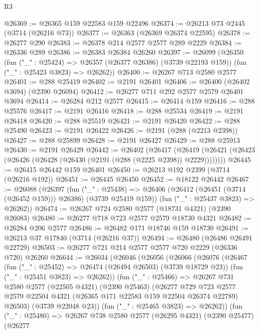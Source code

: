 \begin{lexlean}{R3}
\begin{coremodule}
@26369 := @26365 @159 @22583 @159 @22496
@26374 := @26213 @73 @2445 (@3714 (@26216 @73))
@26377 := @26363 (@26369 @26374 @22595)
@26378 := @26277 @290
@26383 := @26378 @214 @2577 @2577 @289 @2229
@26384 := @26336 @289
@26386 := @26383 @26384 @26260
@26397 := @26099
    (@26350
      (fun ("_" : @25424) => @26357 (@26377 @26386) (@3739 @22193 @159))
      (fun ("_" : @25423 @3823) => @26262))
@26400 := @26267 @713 @2580 @2577
@26401 := @288 @25419
@26402 := @2191 @26401
@26406 := @26400 (@26402 @3694) (@2390 @26094)
@26412 := @26277 @711 @292 @2577 @2579 @26401 @3694
@26414 := @26284 @212 @2577
@26415 := @26414 @159
@26416 := @288 @25576
@26417 := @2191 @26416
@26418 := @288 @25534
@26419 := @2191 @26418
@26420 := @288 @25519
@26421 := @2191 @26420
@26422 := @288 @25490
@26423 := @2191 @26422
@26426 := @2191 (@288 (@2213 @2398))
@26427 := @288 @25899
@26428 := @2191 @26427
@26429 := @288 @25913
@26430 := @2191 @26429
@26442 := @26402
    (@26417
      (@26419 (@26421 (@26423 (@26426 (@26428 (@26430 (@2191 (@288 (@2225 @2398)) @2229))))))))
@26445 := @26415 @26442 @159 @26401
@26450 := @26213 @192 @2399 (@3714 (@26216 @192))
@26451 := @26445 @26450
@26452 := @18122 @26442
@26467 := @26088
    (@26397
      (fun ("_" : @25438) =>
      @26406 (@26412 (@26451 (@3714 (@26452 @159))) @26386) (@3739 @25419 @159))
      (fun ("_" : @25437 @3823) => @26262))
@26474 := @26267 @724 @2580 @2577 (@18731 @4321) (@2390 @26083)
@26480 := @26277 @718 @723 @2577 @2579 @18730 @4321
@26482 := @26284 @206 @2577
@26486 := @26482 @171 @18746 @159 @18730
@26491 := @26213 @37 @17840 (@3714 (@26216 @37))
@26494 := @26480 (@26486 @26491 @22729)
@26503 := @26277 @721 @214 @2577 @2577 @720 @2229 (@26336 @720) @26260
@26644 := @26034
    (@26046
      (@26056
        (@26066
          (@26076
            (@26467
              (fun ("_" : @25452) => @26474 (@26494 @26503) (@3739 @18729 @23))
              (fun ("_" : @25451 @3823) => @26262))
            (fun ("_" : @25466) =>
            @26267
              @731
              @2580
              @2577
              (@22505 @4321)
              (@2390 @25463)
              (@26277
                @729
                @723
                @2577
                @2579
                @22504
                @4321
                (@26365 @171 @22583 @159 @22504 @26374 @22789)
                @26503)
              (@3739 @22048 @23))
            (fun ("_" : @25465 @3823) => @26262))
          (fun ("_" : @25480) =>
          @26267
            @738
            @2580
            @2577
            (@26295 @4321)
            (@2390 @25477)
            (@26277

\end{coremodule}
\end{lexlean}
